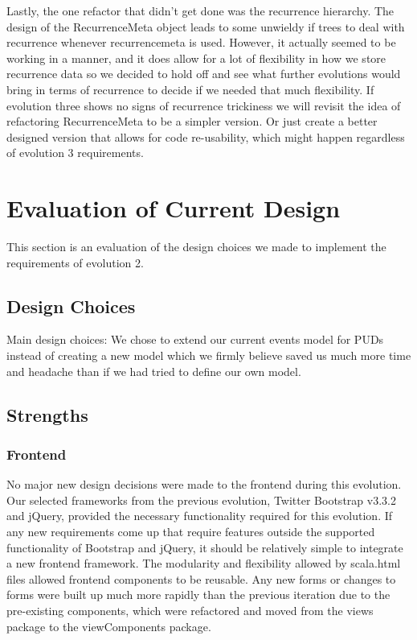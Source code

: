 \documentclass{article}
\begin{document}
Lastly, the one refactor that didn't get done was the recurrence hierarchy. The design of the RecurrenceMeta object leads to some unwieldy if trees to deal with recurrence whenever recurrencemeta is used. However, it actually seemed to be working in a manner, and it does allow for a lot of flexibility in how we store recurrence data so we decided to hold off and see what further evolutions would bring in terms of recurrence to decide if we needed that much flexibility. If evolution three shows no signs of recurrence trickiness we will revisit the idea of refactoring RecurrenceMeta to be a simpler version. Or just create a better designed version that allows for code re-usability, which might happen regardless of evolution 3 requirements.

\section{Evaluation of Current Design}
This section is an evaluation of the design choices we made to implement the requirements of evolution 2.
\subsection{Design Choices}
Main design choices:
We chose to extend our current events model for PUDs instead of creating a new model which we firmly believe saved us much more time and headache than if we had tried to define our own model.



\subsection{Strengths}
\subsubsection{Frontend}
No major new design decisions were made to the frontend during this evolution. Our selected frameworks from the previous evolution, Twitter Bootstrap v3.3.2 and jQuery, provided the necessary functionality required for this evolution. If any new requirements come up that require features outside the supported functionality of Bootstrap and jQuery, it should be relatively simple to integrate a new frontend framework.
The modularity and flexibility allowed by scala.html files allowed frontend components to be reusable. Any new forms or changes to forms were built up much more rapidly than the previous iteration due to the pre-existing components, which were refactored and moved from the views package to the viewComponents package.
\end{document}
